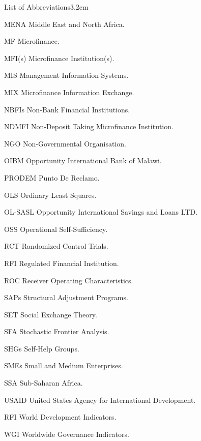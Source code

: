\begin{mclistof}{List of Abbreviations}{3.2cm}
\item[MENA] Middle East and North Africa.

\item[MF] Microfinance.

\item[MFI(s)] Microfinance Institution(s).

\item[MIS] Management Information Systems.

\item[MIX] Microfinance Information Exchange.

\item[NBFIs] Non-Bank Financial Institutions.

\item[NDMFI] Non-Deposit Taking Microfinance Institution.

\item[NGO] Non-Governmental Organisation.

\item[OIBM] Opportunity International Bank of Malawi.

\item[PRODEM] Punto De Reclamo.

\item[OLS] Ordinary Least Squares.

\item[OL-SASL] Opportunity International Savings and Loans LTD.

\item[OSS] Operational Self-Sufficiency.

\item[RCT] Randomized Control Trials.

\item[RFI] Regulated Financial Institution.

\item[ROC] Receiver Operating Characteristics.

\item[SAPs] Structural Adjustment Programs.

\item[SET] Social Exchange Theory.

\item[SFA] Stochastic Frontier Analysis.

\item[SHGs] Self-Help Groups.

\item[SMEs] Small and Medium Enterprises.

\item[SSA] Sub-Saharan Africa.

\item[USAID] United States Agency for International Development.

\item[RFI] World Development Indicators.

\item[WGI] Worldwide Governance Indicators.

\end{mclistof} 
